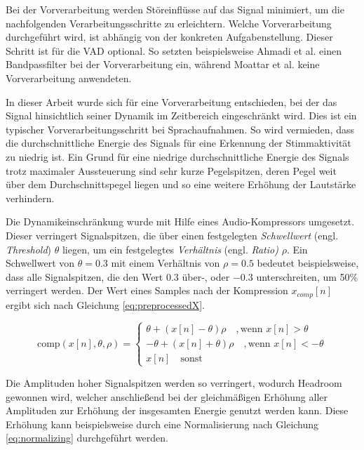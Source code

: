 Bei der Vorverarbeitung werden Störeinflüsse auf das Signal minimiert, um die nachfolgenden Verarbeitungsschritte zu erleichtern. Welche Vorverarbeitung durchgeführt wird, ist abhängig von der konkreten Aufgabenstellung. Dieser Schritt ist für die VAD optional. So setzten beispielsweise Ahmadi et al. \cite{vad_ceps} einen Bandpassfilter bei der Vorverarbeitung ein, während Moattar et al. \cite{vad_Easy} keine Vorverarbeitung anwendeten. 

In dieser Arbeit wurde sich für eine Vorverarbeitung entschieden, bei der das Signal hinsichtlich seiner Dynamik im Zeitbereich eingeschränkt wird. Dies ist ein typischer Vorverarbeitungsschritt bei Sprachaufnahmen. So wird vermieden, dass die durchschnittliche Energie des Signals für eine Erkennung der Stimmaktivität zu niedrig ist. Ein Grund für eine niedrige durchschnittliche Energie des Signals trotz maximaler Aussteuerung sind sehr kurze Pegelspitzen, deren Pegel weit über dem Durchschnittspegel liegen und so eine weitere Erhöhung der Lautstärke verhindern.

Die Dynamikeinschränkung wurde mit Hilfe eines Audio-Kompressors umgesetzt. Dieser verringert Signalspitzen, die über einen festgelegten \emph{Schwellwert} (engl. \emph{Threshold}) $\theta$ liegen, um ein festgelegtes \emph{Verhältnis} (engl. \emph{Ratio)} $\rho$. Ein Schwellwert von $\theta = 0.3$ mit einem Verhältnis von $\rho = 0.5$ bedeutet beispielsweise, dass alle Signalspitzen, die den Wert 0.3 über-, oder $-0.3$ unterschreiten, um 50\% verringert werden. Der Wert eines Samples nach der Kompression $x_{comp}[n]$ ergibt sich nach Gleichung \ref{eq:preprocessedX}.

\begin{equation}
\text{comp}(x[n], \theta, \rho) =
\begin{cases}
\theta + (x[n] - \theta) \rho \quad , \text{wenn } x[n] > \theta \\
-\theta + (x[n] + \theta) \rho \quad, \text{wenn } x[n] < -\theta \\
x[n] \quad \text{sonst}
\end{cases}
\label{eq:preprocessedX}
\end{equation}

Die Amplituden hoher Signalspitzen werden so verringert, wodurch Headroom gewonnen wird, welcher anschließend bei der gleichmäßigen Erhöhung aller Amplituden zur Erhöhung der insgesamten Energie genutzt werden kann. Diese Erhöhung kann beispielsweise durch eine Normalisierung nach Gleichung \ref{eq:normalizing} durchgeführt werden.


